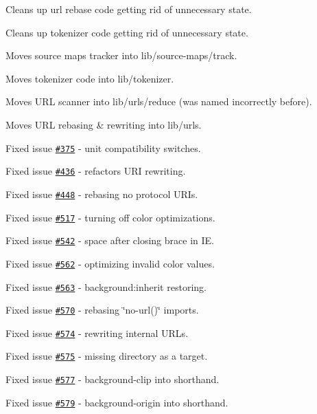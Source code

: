 \begin{DoxyItemize}
\item Cleans up url rebase code getting rid of unnecessary state.
\item Cleans up tokenizer code getting rid of unnecessary state.
\item Moves source maps tracker into lib/source-\/maps/track.
\item Moves tokenizer code into lib/tokenizer.
\item Moves U\+RL scanner into lib/urls/reduce (was named incorrectly before).
\item Moves U\+RL rebasing \& rewriting into lib/urls.
\item Fixed issue \href{https://github.com/jakubpawlowicz/clean-css/issues/375}{\tt \#375} -\/ unit compatibility switches.
\item Fixed issue \href{https://github.com/jakubpawlowicz/clean-css/issues/436}{\tt \#436} -\/ refactors U\+RI rewriting.
\item Fixed issue \href{https://github.com/jakubpawlowicz/clean-css/issues/448}{\tt \#448} -\/ rebasing no protocol U\+R\+Is.
\item Fixed issue \href{https://github.com/jakubpawlowicz/clean-css/issues/517}{\tt \#517} -\/ turning off color optimizations.
\item Fixed issue \href{https://github.com/jakubpawlowicz/clean-css/issues/542}{\tt \#542} -\/ space after closing brace in IE.
\item Fixed issue \href{https://github.com/jakubpawlowicz/clean-css/issues/562}{\tt \#562} -\/ optimizing invalid color values.
\item Fixed issue \href{https://github.com/jakubpawlowicz/clean-css/issues/563}{\tt \#563} -\/ {\ttfamily background\+:inherit} restoring.
\item Fixed issue \href{https://github.com/jakubpawlowicz/clean-css/issues/570}{\tt \#570} -\/ rebasing \char`\"{}no-\/url()\char`\"{} imports.
\item Fixed issue \href{https://github.com/jakubpawlowicz/clean-css/issues/574}{\tt \#574} -\/ rewriting internal U\+R\+Ls.
\item Fixed issue \href{https://github.com/jakubpawlowicz/clean-css/issues/575}{\tt \#575} -\/ missing directory as a {\ttfamily target}.
\item Fixed issue \href{https://github.com/jakubpawlowicz/clean-css/issues/577}{\tt \#577} -\/ {\ttfamily background-\/clip} into shorthand.
\item Fixed issue \href{https://github.com/jakubpawlowicz/clean-css/issues/579}{\tt \#579} -\/ {\ttfamily background-\/origin} into shorthand.

\end{DoxyItemize}
